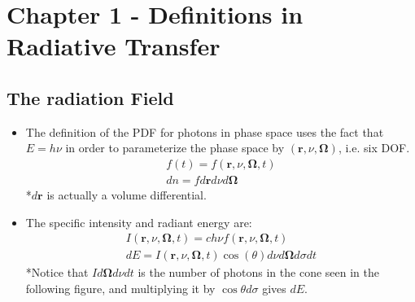 \documentclass[15pt]{article}
\begin{document}
\section{Chapter 1 - Definitions in Radiative Transfer}
\subsection{The radiation Field}
\begin{itemize}
    \item The definition of the PDF for photons in phase space uses the fact that $E=h\nu$ in order to parameterize the phase space by $(\bm{r},\nu,\bm{\Omega})$, i.e. six DOF.
    \begin{align}
        f(t)=f(\bm{r},\nu,\bm{\Omega}, t)\\
        dn=fd\bm{r}d\nu d\bm{\Omega}
    \end{align}
    *$d\bm{r}$ is actually a volume differential.
    \item The specific intensity and radiant energy are:
    \begin{align}
        I(\bm{r},\nu,\bm{\Omega}, t)=ch\nu f(\bm{r},\nu,\bm{\Omega}, t)\\
        dE=I(\bm{r},\nu,\bm{\Omega}, t)\cos(\theta)d\nu d\bm\Omega d\sigma dt
    \end{align}
    *Notice that $Id\bm\Omega d\nu dt$ is the number of photons in the cone seen in the following figure, and multiplying it by $\cos\theta d\sigma$ gives $dE$.
\end{itemize}
\end{document}
